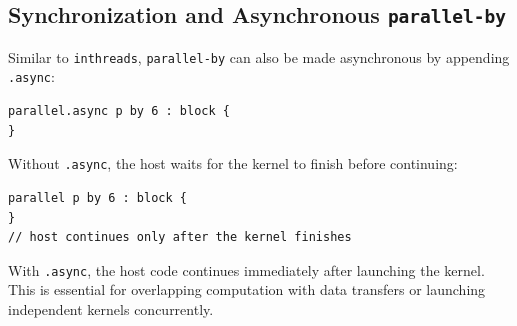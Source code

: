 \subsection*{Synchronization and Asynchronous \texttt{parallel-by}}

Similar to \texttt{inthreads}, \texttt{parallel-by} can also be made asynchronous by appending \texttt{.async}:

\begin{lstlisting}[language=croqtile,caption={An asynchronous launch}]
parallel.async p by 6 : block {
}
\end{lstlisting}

Without \texttt{.async}, the host waits for the kernel to finish before continuing:

\begin{lstlisting}[language=croqtile,caption={The synchronous form}]
parallel p by 6 : block {
}
// host continues only after the kernel finishes
\end{lstlisting}

With \texttt{.async}, the host code continues immediately after launching the kernel. This is essential for overlapping computation with data transfers or launching independent kernels concurrently.
